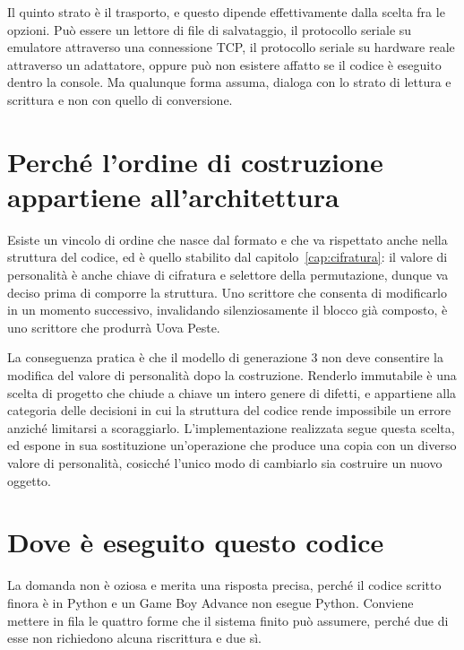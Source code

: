 Il quinto strato è il trasporto, e questo dipende effettivamente dalla scelta fra le opzioni. Può essere un lettore di file di salvataggio, il protocollo seriale su emulatore attraverso una connessione TCP, il protocollo seriale su hardware reale attraverso un adattatore, oppure può non esistere affatto se il codice è eseguito dentro la console. Ma qualunque forma assuma, dialoga con lo strato di lettura e scrittura e non con quello di conversione.

\section{Perché l'ordine di costruzione appartiene all'architettura}

Esiste un vincolo di ordine che nasce dal formato e che va rispettato anche nella struttura del codice, ed è quello stabilito dal capitolo~\ref{cap:cifratura}: il valore di personalità è anche chiave di cifratura e selettore della permutazione, dunque va deciso prima di comporre la struttura. Uno scrittore che consenta di modificarlo in un momento successivo, invalidando silenziosamente il blocco già composto, è uno scrittore che produrrà Uova Peste.

La conseguenza pratica è che il modello di generazione 3 non deve consentire la modifica del valore di personalità dopo la costruzione. Renderlo immutabile è una scelta di progetto che chiude a chiave un intero genere di difetti, e appartiene alla categoria delle decisioni in cui la struttura del codice rende impossibile un errore anziché limitarsi a scoraggiarlo. L'implementazione realizzata segue questa scelta, ed espone in sua sostituzione un'operazione che produce una copia con un diverso valore di personalità, cosicché l'unico modo di cambiarlo sia costruire un nuovo oggetto.

\section{Dove è eseguito questo codice}

La domanda non è oziosa e merita una risposta precisa, perché il codice scritto finora è in Python e un Game Boy Advance non esegue Python. Conviene mettere in fila le quattro forme che il sistema finito può assumere, perché due di esse non richiedono alcuna riscrittura e due sì.

